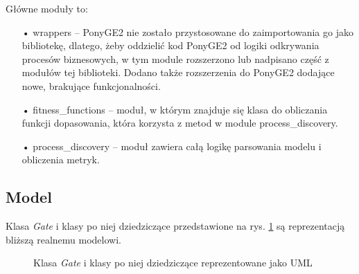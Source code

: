 Główne moduły to:

\begin{itemize}
  \item[•] wrappers -- PonyGE2 nie zostało przystosowane do zaimportowania go jako bibliotekę, dlatego, żeby oddzielić kod PonyGE2 od logiki odkrywania procesów biznesowych, w tym module rozszerzono lub nadpisano część z modułów tej biblioteki. Dodano także rozszerzenia do PonyGE2 dodające nowe, brakujące funkcjonalności.
  \item[•] fitness{\_}functions -- moduł, w którym znajduje się klasa do obliczania funkcji dopasowania, która korzysta z metod w module process{\_}discovery.
  \item[•] process{\_}discovery -- moduł zawiera całą logikę parsowania modelu i obliczenia metryk.
\end{itemize}

\subsection{Model} 
Klasa \textit{Gate} i klasy po niej dziedziczące przedstawione na rys. \ref{fig:GateUML} są reprezentacją bliższą realnemu modelowi. 

\begin{figure}[H]
	\caption{\label{fig:GateUML}Klasa \textit{Gate} i klasy po niej dziedziczące reprezentowane jako UML}
\end{figure}

